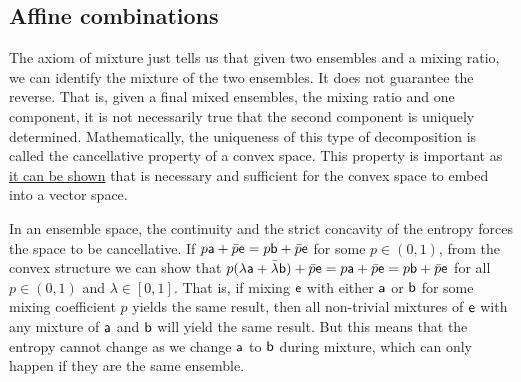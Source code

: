 
\subsection{Affine combinations}

The axiom of mixture just tells us that given two ensembles and a mixing ratio, we can identify the mixture of the two ensembles. It does not guarantee the reverse. That is, given a final mixed ensembles, the mixing ratio and one component, it is not necessarily true that the second component is uniquely determined. Mathematically, the uniqueness of this type of decomposition is called the cancellative property of a convex space. This property is important as \href{https://arxiv.org/abs/1105.1270}{it can be shown} that is necessary and sufficient for the convex space to embed into a vector space.

In an ensemble space, the continuity and the strict concavity of the entropy forces the space to be cancellative. If $p \ens[a] + \bar{p} \ens = p \ens[b] + \bar{p} \ens$ for some $p \in (0,1)$, from the convex structure we can show that $p(\lambda\ens[a] + \bar{\lambda}\ens[b]) + \bar{p} \ens = p\ens[a] + \bar{p} \ens = p \ens[b] + \bar{p} \ens$ for all $p \in (0,1)$ and $\lambda \in [0,1]$. That is, if mixing $\ens$ with either $\ens[a]$ or $\ens[b]$ for some mixing coefficient $p$ yields the same result, then all non-trivial mixtures of $\ens$ with any mixture of $\ens[a]$ and $\ens[b]$ will yield the same result. But this means that the entropy cannot change as we change $\ens[a]$ to $\ens[b]$ during mixture, which can only happen if they are the same ensemble.

